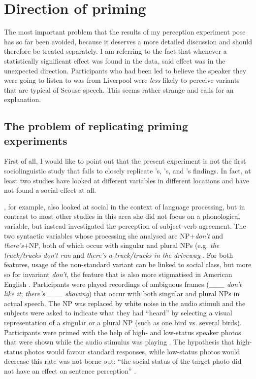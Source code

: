 	\section{Direction of priming}
		\label{sec.perc_res.disc.direction}

The most important problem that the results of my perception experiment pose has so far been avoided, because it deserves a more detailed discussion and should therefore be treated separately.
I am referring to the fact that whenever a statistically significant  effect was found in the data, said effect was in the unexpected direction.
Participants who had been led to believe the speaker they were going to listen to was from Liverpool were \emph{less} likely to perceive variants that are typical of Scouse speech.
This seems rather strange and calls for an explanation.

		\subsection{The problem of replicating priming experiments}

First of all, I would like to point out that the present experiment is not the first sociolinguistic study that fails to closely replicate \citeauthor{niedzielski1999}'s, \citeauthor{hayetal2006a}'s, and \citeauthor{haydrager2010}'s findings.
In fact, at least two studies have looked at different variables in different locations and have not found a social  effect at all.

\citeauthor{squires2013}, for example, also looked at social  in the context of language processing, but in contrast to most other studies in this area she did not focus on a phonological variable, but instead investigated the perception of subject-verb agreement.
The two syntactic variables whose processing she analysed are NP+\emph{don't} and \emph{there's}+NP, both of which occur with singular and plural NPs (e.g. \emph{the truck/trucks don't run} and \emph{there's a truck/trucks in the driveway} \parencite[cf.][206]{squires2013}.
For both features, usage of the non-standard variant can be linked to social class, but more so for invariant \emph{don't}, the feature that is also more stigmatised in American English \parencite[cf.][207--208]{squires2013}.
Participants were played recordings of ambiguous frames (\emph{\_\_\_ don't like it}; \emph{there's \_\_\_ showing}) that occur with both singular and plural NPs in actual speech.
The NP was replaced by white noise in the audio stimuli and the subjects were asked to indicate what they had ``heard'' by selecting a visual representation of a singular or a plural NP (such as one bird vs. several birds).
Participants were primed with the help of high- and low-status speaker photos that were shown while the audio stimulus was playing \parencite[cf.][210--211]{squires2013}.
The hypothesis that high-status photos would favour standard responses, while low-status photos would decrease this rate was not borne out: ``the social status of the target photo did not have an effect on sentence perception'' \parencite[216]{squires2013}.

